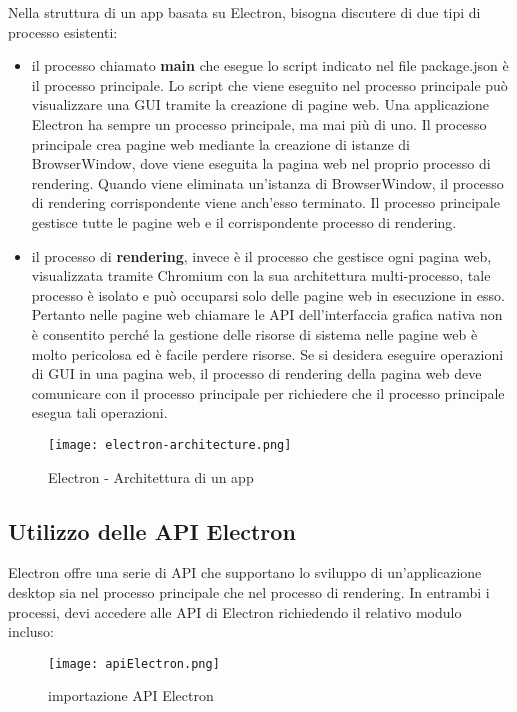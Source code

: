 Nella struttura di un app basata su Electron, bisogna discutere di due tipi di processo esistenti:
\begin{itemize}
	\item  il processo chiamato \textbf{main} che esegue lo script indicato nel file package.json è il processo principale. Lo script che viene eseguito nel processo principale può visualizzare una \Gls{GUI} tramite la creazione di pagine web. Una applicazione Electron ha sempre un 		processo principale, ma mai più di uno. Il processo principale crea pagine web mediante la creazione di istanze di BrowserWindow, dove viene eseguita la pagina web nel proprio processo di rendering. Quando viene eliminata un'istanza di BrowserWindow, il processo di 		rendering corrispondente viene anch'esso terminato. Il processo principale gestisce tutte le pagine web e il corrispondente processo di rendering.
	\item il processo di \textbf{rendering}, invece è il processo che gestisce ogni pagina web, visualizzata tramite Chromium con la sua architettura multi-processo, tale processo è isolato e può occuparsi solo delle pagine web in esecuzione in esso.
	Pertanto nelle pagine web chiamare le API dell'interfaccia grafica nativa non è consentito perché la gestione delle risorse di sistema nelle pagine web è molto pericolosa ed è facile perdere risorse. Se si desidera eseguire operazioni di \Gls{GUI} in una pagina web, il processo di 		rendering della pagina web deve comunicare con il processo principale per richiedere che il processo principale esegua tali operazioni.
\end{itemize}

\begin{figure}[H]
    \centering
    \texttt{[image: electron-architecture.png]}
    \caption{Electron - Architettura di un app}
    \label{fig:ElectronArch}
\end{figure}


\subsection{Utilizzo delle API Electron}

Electron offre una serie di API che supportano lo sviluppo di un'applicazione desktop sia nel processo principale che nel processo di rendering. In entrambi i processi, devi accedere alle API di Electron richiedendo il relativo modulo incluso:

\begin{figure}[H]
    \centering
    \texttt{[image: apiElectron.png]}
    \caption{importazione API Electron}
    \label{fig:ApiElectron}
\end{figure}

